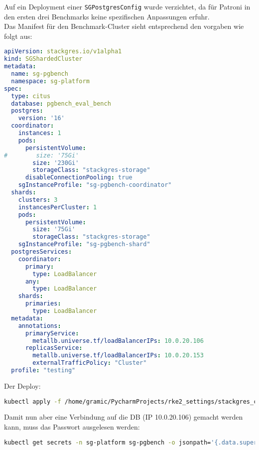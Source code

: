Auf ein Deployment einer \texttt{SGPostgresConfig} wurde verzichtet, da für Patroni in den ersten drei Benchmarks keine spezifischen Anpassungen erfuhr.\\
Das Manifest für den Benchmark-Cluster sieht entsprechend den vorgaben wie folgt aus:
\lstset{style=gra_codestyle}
\begin{lstlisting}[language=yaml, caption=StackGres-Citus - Benchmarking - SGShardedCluster,captionpos=b,label={lst:SGShardedCluster_pgbench.yaml},breaklines=true]
apiVersion: stackgres.io/v1alpha1
kind: SGShardedCluster
metadata:
  name: sg-pgbench
  namespace: sg-platform
spec:
  type: citus
  database: pgbench_eval_bench
  postgres:
    version: '16'
  coordinator:
    instances: 1
    pods:
      persistentVolume:
#        size: '75Gi'
        size: '230Gi'
        storageClass: "stackgres-storage"
      disableConnectionPooling: true
    sgInstanceProfile: "sg-pgbench-coordinator"
  shards:
    clusters: 3
    instancesPerCluster: 1
    pods:
      persistentVolume:
        size: '75Gi'
        storageClass: "stackgres-storage"
    sgInstanceProfile: "sg-pgbench-shard"
  postgresServices:
    coordinator:
      primary:
        type: LoadBalancer
      any:
        type: LoadBalancer
    shards:
      primaries:
        type: LoadBalancer
  metadata:
    annotations:
      primaryService:
        metallb.universe.tf/loadBalancerIPs: 10.0.20.106
      replicasService:
        metallb.universe.tf/loadBalancerIPs: 10.0.20.153
        externalTrafficPolicy: "Cluster"
  profile: "testing"
\end{lstlisting}
Der Deploy:
\lstset{style=gra_codestyle}
\begin{lstlisting}[language=bash, caption=StackGres-Citus - Benchmark - Cluster Deploy,captionpos=b,label={lst:stackgres_citus-benchmnarking-deploy-cluster},breaklines=true]
kubectl apply -f /home/gramic/PycharmProjects/rke2_settings/stackgres_citus/stackgres_citus/SGShardedCluster_pgbench.yaml
\end{lstlisting}

Damit nun aber eine Verbindung auf die DB (IP 10.0.20.106) gemacht werden kann, muss das Passwort ausgelesen werden:
\lstset{style=gra_codestyle}
\begin{lstlisting}[language=bash, caption=StackGres-Citus - Benchmark DB Passwort,captionpos=b,label={lst:stackgres_citus-get-benchmark-cluster-passwd},breaklines=true]
kubectl get secrets -n sg-platform sg-pgbench -o jsonpath='{.data.superuser-password}' | base64 -d
\end{lstlisting}

